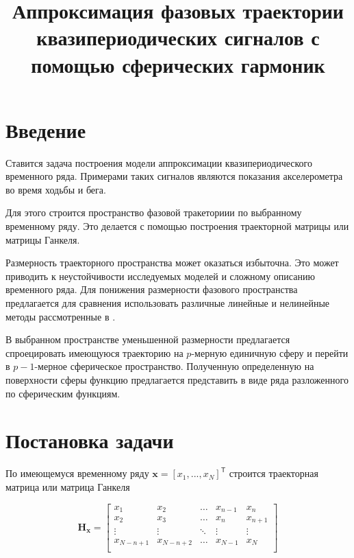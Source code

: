 \documentclass[12pt,twoside]{article}
\title
    [Аппроксимация фазовой траектории] 
    {Аппроксимация фазовых траектории квазипериодических сигналов с помощью сферических гармоник}
\begin{document}
\newcommand{\nsymbol}[2]{\medskip\hangindent=\parindent\hangafter=1\noindent $#1$ --- #2\par}
\newcommand{\nsymbolp}[3]{\nsymbol{#1}{#2 \dotfill\pageref{#3}}}

\newcommand{\hookuparrow}{\mathrel{\rotatebox[origin=t]{270}{$\hookleftarrow$}}}
\newcommand{\hookdownarrow}{\mathrel{\rotatebox[origin=t]{90}{$\hookleftarrow$}}}

\maketitle

\section{Введение}
Ставится задача построения модели аппроксимации квазипериодического временного ряда. Примерами таких сигналов являются показания акселерометра во время ходьбы и бега.\cite{1999}  
	
Для этого строится пространство фазовой тракеториии по выбранному временному ряду.  Это делается с помощью построения траекторной матрицы или матрицы Ганкеля.
	
Размерность траекторного пространства может оказаться избыточна. Это может приводить к неустойчивости исследуемых моделей и сложному описанию временного ряда. Для понижения размерности фазового пространства предлагается для сравнения использовать  различные линейные и нелинейные методы рассмотренные в \cite{Maaten2007}.
	
В выбранном пространстве уменьшенной размерности предлагается спроецировать имеющуюся траекторию на $p$-мерную единичную сферу и перейти в $p-1$-мерное сферическое пространство. Полученную определенную на поверхности сферы функцию предлагается представить в виде ряда разложенного по сферическим функциям.
	

\section{Постановка задачи}
По имеющемуся временному ряду $\mathbf{x}=[x_1,...,x_N]^{\mathsf{T}}$ строится траекторная матрица или матрица Ганкеля

\begin{equation}
\mathbf{H_{x}} = 
\begin{bmatrix} 
	x_{1} & x_{2} & \ldots &x_{n-1} &x_{n}\\
	x_{2} & x_{3} & \ldots &x_{n} &x_{n+1}\\
	\vdots& \vdots & \ddots & \vdots & \vdots\\
	x_{N-n+1} & x_{N-n+2} &\ldots&x_{N-1} &x_{N}\\
\end{bmatrix}
\label{eq:hankel_matrix}
\end{equation}
\end{document}
